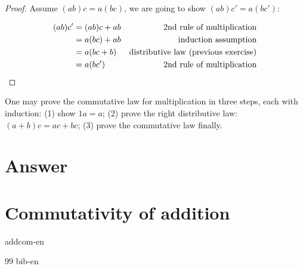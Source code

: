\documentclass[b5paper]{article}
\begin{document}
\begin{Answer}[ref={ex:zero}]
{\begin{proof}
Assume $(ab)c = a(bc)$, we are going to show $(ab)c' = a(bc')$:

\begin{align*}
(ab)c' & = (ab)c + ab & \text{2nd rule of multiplication} &\\
       & = a(bc) + ab & \text{induction assumption} &\\
       & = a(bc + b) & \text{distributive law (previous exercise)} &\\
       & = a(bc') & \text{2nd rule of multiplication} &\qedhere
\end{align*}
\end{proof}

One may prove the commutative law for multiplication in three steps, each with induction: (1) show $1a = a$; (2) prove the right distributive law: $(a + b)c = ac + bc$; (3) prove the commutative law finally.
}

\end{Answer}

\ifx\wholebook\relax \else
\section{Answer}
\shipoutAnswer

\section{Commutativity of addition}
{addcom-en}

\begin{thebibliography}{99}
{bib-en}
\end{thebibliography}

\expandafter\enddocument
\fi
\end{document}

